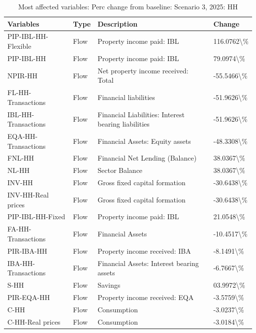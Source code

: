 \documentclass[
]{book}
\begin{document}
\begin{table}

\caption{\label{tab:most-affected-Scenario-3-perc-HH-2025}Most affected variables: Perc change from baseline: Scenario 3, 2025: HH}
\centering
\fontsize{10}{12}\selectfont
\begin{tabular}[t]{l|l|l|l}
\hline
Variables & Type & Description & Change\\
\hline
PIP-IBL-HH-Flexible & Flow & Property income paid: IBL & 116.0762\textbackslash{}\%\\
\hline
PIP-IBL-HH & Flow & Property income paid: IBL & 79.0974\textbackslash{}\%\\
\hline
NPIR-HH & Flow & Net property income received: Total & -55.5466\textbackslash{}\%\\
\hline
FL-HH-Transactions & Flow & Financial liabilities & -51.9626\textbackslash{}\%\\
\hline
IBL-HH-Transactions & Flow & Financial Liabilities: Interest bearing liabilities & -51.9626\textbackslash{}\%\\
\hline
EQA-HH-Transactions & Flow & Financial Assets: Equity assets & -48.3308\textbackslash{}\%\\
\hline
FNL-HH & Flow & Financial Net Lending (Balance) & 38.0367\textbackslash{}\%\\
\hline
NL-HH & Flow & Sector Balance & 38.0367\textbackslash{}\%\\
\hline
INV-HH & Flow & Gross fixed capital formation & -30.6438\textbackslash{}\%\\
\hline
INV-HH-Real prices & Flow & Gross fixed capital formation & -30.6438\textbackslash{}\%\\
\hline
PIP-IBL-HH-Fixed & Flow & Property income paid: IBL & 21.0548\textbackslash{}\%\\
\hline
FA-HH-Transactions & Flow & Financial Assets & -10.4517\textbackslash{}\%\\
\hline
PIR-IBA-HH & Flow & Property income received: IBA & -8.1491\textbackslash{}\%\\
\hline
IBA-HH-Transactions & Flow & Financial Assets: Interest bearing assets & -6.7667\textbackslash{}\%\\
\hline
S-HH & Flow & Savings & 03.9972\textbackslash{}\%\\
\hline
PIR-EQA-HH & Flow & Property income received: EQA & -3.5759\textbackslash{}\%\\
\hline
C-HH & Flow & Consumption & -3.0237\textbackslash{}\%\\
\hline
C-HH-Real prices & Flow & Consumption & -3.0184\textbackslash{}\%\\

\end{tabular}
\end{table}
\end{document}

